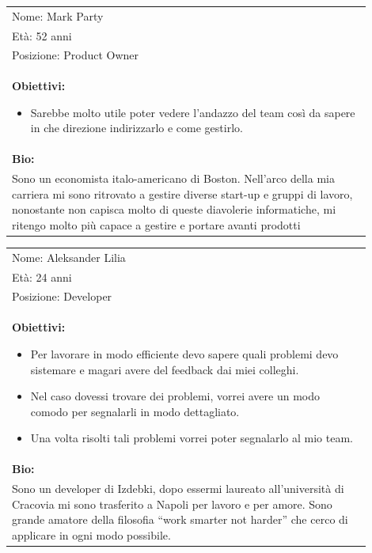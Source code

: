 \documentclass[a4paper, 11pt]{article}
\begin{document}
\begin{table}[H]
    \centering
    \begin{tabular}{|p{0.9\linewidth}|}
        \hline
        Nome: Mark Party \\
        Età: 52 anni \\
        Posizione: Product Owner \\
        \hline
        \begin{minipage}[t]{\linewidth}
            \textbf{Obiettivi:}
            \begin{itemize}
                \item Sarebbe molto utile poter vedere l'andazzo del team così da sapere in che direzione indirizzarlo e come gestirlo.
            \end{itemize}
        \end{minipage} \\
        \hline
        \textbf{Bio:} \\
        Sono un economista italo-americano di Boston. Nell'arco della mia carriera mi sono ritrovato a gestire diverse start-up e gruppi di lavoro, nonostante non capisca molto di queste diavolerie informatiche, mi ritengo molto più capace a gestire e portare avanti prodotti \\
        \hline
    \end{tabular}
\end{table}

\begin{table}[H]
    \centering
    \begin{tabular}{|p{0.9\linewidth}|}
        \hline
        Nome: Aleksander Lilia \\
        Età: 24 anni \\
        Posizione: Developer \\
        \hline
        \begin{minipage}[t]{\linewidth}
            \textbf{Obiettivi:}
            \begin{itemize}
                \item Per lavorare in modo efficiente devo sapere quali problemi devo sistemare e magari avere del feedback dai miei colleghi.
                \item Nel caso dovessi trovare dei problemi, vorrei avere un modo comodo per segnalarli in modo dettagliato.
                \item Una volta risolti tali problemi vorrei poter segnalarlo al mio team.
            \end{itemize}
        \end{minipage} \\
        \hline
        \textbf{Bio:} \\
        Sono un developer di Izdebki, dopo essermi laureato all’università di Cracovia mi sono trasferito a Napoli per lavoro e per amore. Sono grande amatore della filosofia “work smarter not harder” che cerco di applicare in ogni modo possibile. \\      
        \hline
    \end{tabular}
\end{table}
\end{document}
